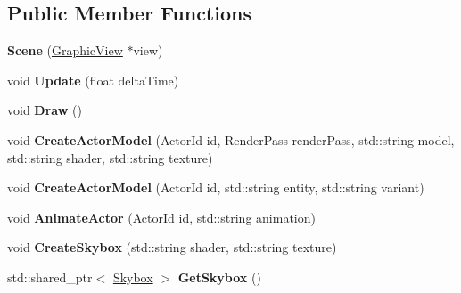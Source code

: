 \subsection*{Public Member Functions}
\begin{DoxyCompactItemize}
\item 
\mbox{\label{classTarbora_1_1Scene_aa9310feeb7a221c6cd0f1e1c71b62195}} 
{\bfseries Scene} (\hyperlink{classTarbora_1_1GraphicView}{Graphic\+View} $\ast$view)
\item 
\mbox{\label{classTarbora_1_1Scene_a7e04a725cf3d429857ac172aaa1b879c}} 
void {\bfseries Update} (float delta\+Time)
\item 
\mbox{\label{classTarbora_1_1Scene_a29a7a8845364aaa76db679d4e58f70ed}} 
void {\bfseries Draw} ()
\item 
\mbox{\label{classTarbora_1_1Scene_acfa9073b3555c7f264eb66e5c8c34ca8}} 
void {\bfseries Create\+Actor\+Model} (Actor\+Id id, Render\+Pass render\+Pass, std\+::string model, std\+::string shader, std\+::string texture)
\item 
\mbox{\label{classTarbora_1_1Scene_a0c0ac47ee6e38af6c7b8003231a3a155}} 
void {\bfseries Create\+Actor\+Model} (Actor\+Id id, std\+::string entity, std\+::string variant)
\item 
\mbox{\label{classTarbora_1_1Scene_a09ae9361429b5ec7ee3a3ee42b77f510}} 
void {\bfseries Animate\+Actor} (Actor\+Id id, std\+::string animation)
\item 
\mbox{\label{classTarbora_1_1Scene_acc84125c8b349f85b1e35193ed900000}} 
void {\bfseries Create\+Skybox} (std\+::string shader, std\+::string texture)
\item 
\mbox{\label{classTarbora_1_1Scene_a764e523b06753d3fdbe6ac642bd2d64b}} 
std\+::shared\+\_\+ptr$<$ \hyperlink{classTarbora_1_1Skybox}{Skybox} $>$ {\bfseries Get\+Skybox} ()
\item 
\mbox{\label{classTarbora_1_1Scene_a8335dd180437f99af5fb342bf8c9f6a6}} 

\end{DoxyCompactItemize}
